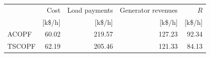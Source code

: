 \begin{table}[!tb]
\centering
\label{tab:settlement_39bus_gfm}
\footnotesize
\setlength{\tabcolsep}{4pt}
\begin{tabular}{lrrrr}
\toprule
 & Cost & Load payments & Generator revenues & $R$ \\
 & [k\$/h] & [k\$/h] & [k\$/h] & [k\$/h] \\
\midrule
\acs{ACOPF} & 60.02 & 219.57 & 127.23 & 92.34 \\
\acs{TSCOPF} & 62.19 & 205.46 & 121.33 & 84.13 \\
\bottomrule
\end{tabular}
\end{table}
